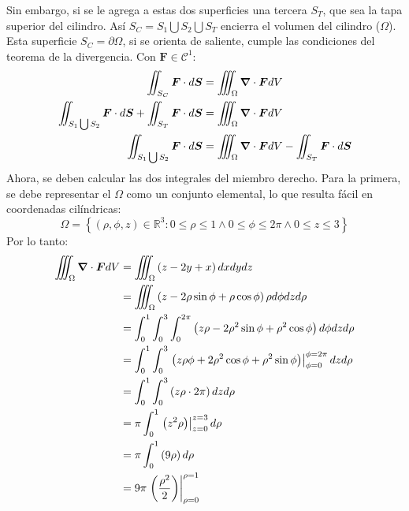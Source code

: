 \begin{solution}
    Sin embargo, si se le agrega a estas dos superficies una tercera $S_T$, que sea la tapa superior del cilindro.
    Así $S_C = S_1 \bigcup S_2 \bigcup S_T$ encierra el volumen del cilindro ($\Omega$). Esta superficie $S_C = \partial\Omega$, si se
    orienta de saliente, cumple las condiciones del teorema de la divergencia. Con $\boldsymbol{F} \in \mathcal{C}^1$:
    \begin{align*}
        \iint_{S_C} \boldsymbol{F} \cdot d\boldsymbol{S} &= \iiint_{\Omega} \grad \cdot \boldsymbol{F} dV\\
        \iint_{S_1 \bigcup S_2} \boldsymbol{F} \cdot d\boldsymbol{S} + \iint_{S_T} \boldsymbol{F} \cdot d\boldsymbol{S}&= \iiint_{\Omega} \grad \cdot \boldsymbol{F} dV\\
        \iint_{S_1 \bigcup S_2} \boldsymbol{F} \cdot d\boldsymbol{S} &= \iiint_{\Omega} \grad \cdot \boldsymbol{F} dV - \iint_{S_T} \boldsymbol{F} \cdot d\boldsymbol{S}
    \end{align*}
    Ahora, se deben calcular las dos integrales del miembro derecho. Para la primera, se debe representar el $\Omega$ 
    como un conjunto elemental, lo que resulta fácil en coordenadas cilíndricas:
    \begin{equation*}
    \Omega = \left\{(\rho,\phi,z) \in \mathbb{R}^3: 0\leq\rho\leq1 \land 0\leq\phi\leq2\pi \land 0\leq z \leq 3 \right\}
    \end{equation*}
    Por lo tanto:
    \begin{align*}
        \iiint_{\Omega} \grad \cdot \boldsymbol{F} dV &= \iiint_{\Omega} \left(z-2y+x\right)dxdydz\\
        &=\iiint_{\Omega} \left(z-2\rho\sin{\phi}+\rho\cos{\phi}\right)\rho d\phi dz d\rho\\
        &=\int_{0}^{1} \int_{0}^{3} \int_{0}^{2\pi} \left(z\rho-2\rho^2\sin{\phi}+\rho^2\cos{\phi}\right) d\phi dz d\rho\\
        &= \int_{0}^{1} \int_{0}^{3}  \left.\left(z\rho\phi+2\rho^2\cos{\phi}+\rho^2\sin{\phi}\right)\right|_{\phi=0}^{\phi=2\pi} dz d\rho\\
        &= \int_{0}^{1} \int_{0}^{3}  \left(z\rho\cdot2\pi\right) dz d\rho\\
        &= \pi\int_{0}^{1}  \left.\left(z^2\rho\right)\right|_{z=0}^{z=3} d\rho\\
        &= \pi\int_{0}^{1}  \left(9\rho\right) d\rho\\
        &= 9\pi \left.\left(\frac{\rho^2}{2}\right)\right|_{\rho=0}^{\rho=1}\\

\end{align*}
\end{solution}
